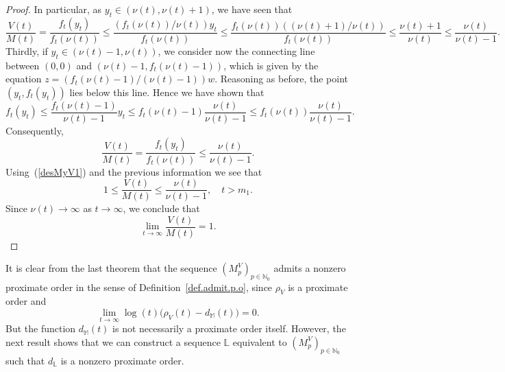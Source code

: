 \documentclass[11pt,a4paper]{article}
\theoremstyle{definition}
\def\oo{\infty}
\def\ri{\rightarrow}
\def\ro{\rho}
\def\N{\mathbb{N}}
\def\M{\mathbb{M}}
\def\L{\mathbb{L}} %
\begin{document}
\begin{proof}
 In particular, as $y_t\in (\nu(t),\nu(t)+1)$, we have seen that
 $$\frac{V(t)}{M(t)} =\frac{f_t(y_t)}{f_t(\nu(t))}\leq \frac{(f_t(\nu(t))/\nu(t)) y_t}{f_t(\nu(t))}
 \leq \frac{f_t(\nu(t))((\nu(t)+1)/\nu(t))}{f_t(\nu(t))}\leq \frac{\nu(t)+1}{\nu(t)}\leq \frac{\nu(t)}{\nu(t)-1}.$$
  Thirdly, if $y_t\in (\nu(t)-1,\nu(t))$, we consider now the connecting line between $(0,0)$ and $(\nu(t)-1, f_t(\nu(t)-1))$, which is given by the
 equation $z=(f_t(\nu(t)-1)/(\nu(t)-1))w$. Reasoning as before, the point $(y_t,f_t(y_t))$ lies below this line. Hence we have shown that
 $$f_t(y_t)\leq \frac{f_t(\nu(t)-1)}{\nu(t)-1} y_t \leq f_t(\nu(t)-1) \frac{\nu(t)}{\nu(t)-1} \leq f_t(\nu(t)) \frac{\nu(t)}{\nu(t)-1}.$$
Consequently,
 $$\frac{V(t)}{M(t)} =\frac{f_t(y_t)}{f_t(\nu(t))} \leq \frac{\nu(t)}{\nu(t)-1}.$$
 Using~(\ref{desMyV1}) and the previous information  we see that
 $$1\leq\frac{V(t)}{M(t)}\leq \frac{\nu(t)}{\nu(t)-1}, \quad t>m_1.$$
Since $\nu(t)\ri\oo$ as $t\to\oo$, we conclude that
 $$\lim_{t\ri\oo} \frac{V(t)}{M(t)}=1.$$
\end{proof}


It is clear from the last theorem that the sequence $(M^V_p)_{p\in\N_0}$ admits a nonzero proximate order in the sense
 of Definition~\ref{def.admit.p.o}, since $\ro_V$ is a proximate order and
 $$
 \lim_{t\to\oo}\log(t)\big(\ro_V(t)-d_{\M}(t)\big)=0.
 $$
 But the function
 $d_{\M}(t)$  is not necessarily a proximate order itself. However, the next result
   shows that we can construct a sequence $\L$ equivalent to $(M^V_p)_{p\in\N_0}$ such that $d_{\L}$ is a nonzero proximate order.
\end{document}
